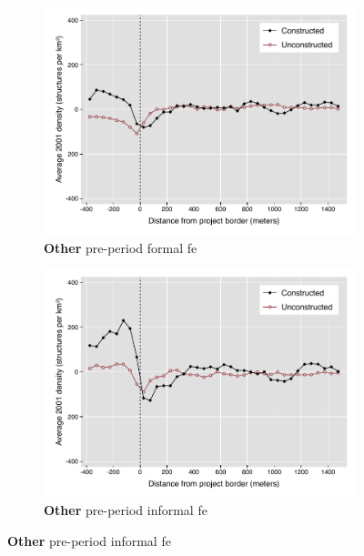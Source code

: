 \documentclass[12pt]{article}
\begin{document}
\begin{figure}
\begin{subfigure}[b]{0.48\textwidth}
        \end{subfigure}
        \begin{subfigure}[b]{0.48\textwidth}
                    \caption[Network2]%
            {{\footnotesize \textbf{Other} pre-period formal fe }}   
            \label{fig:prefor}
            \centering
            \includegraphics[width=\textwidth,trim={0.3cm .3cm 0.1cm 0cm}, clip=true]{figures/bblu_for_fe_pre_means_4_3_sp_postk.pdf}

        \end{subfigure}
        \hfill
        \begin{subfigure}[b]{0.48\textwidth}  
                    \caption[]%
            {{\footnotesize \textbf{Other} pre-period informal fe }}      
            \label{fig:preinf}
            \centering 
            \includegraphics[width=\textwidth,trim={0.3cm .3cm 0.1cm 0cm}, clip=true]{figures/bblu_inf_fe_pre_means_4_3_sp_postk.pdf}

        \end{subfigure}
\end{figure}
\end{document}
